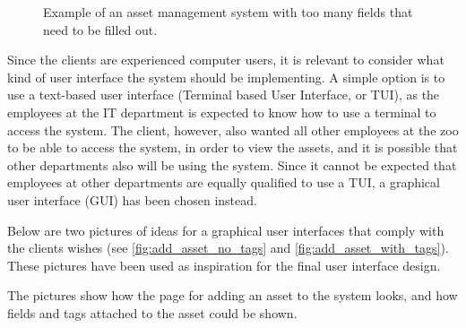 \begin{figure}[H]
    \centering
    \caption{Example of an asset management system with too many fields that need to be filled out. \cite{SnipeIT}}
    \label{fig:too-many-fields}
\end{figure}

Since the clients are experienced computer users, it is relevant to consider what kind of user interface the system should be implementing. A simple option is to use a text-based user interface (Terminal based User Interface, or TUI), as the employees at the IT department is expected to know how to use a terminal to access the system. The client, however, also wanted all other employees at the zoo to be able to access the system, in order to view the assets, and it is possible that other departments also will be using the system. Since it cannot be expected that employees at other departments are equally qualified to use a TUI, a graphical user interface (GUI) has been chosen instead. 
\par
Below are two pictures of ideas for a graphical user interfaces that comply with the clients wishes (see \autoref{fig:add_asset_no_tags} and \autoref{fig:add_asset_with_tags}). These pictures have been used as inspiration for the final user interface design.
\par
The pictures show how the page for adding an asset to the system looks, and how fields and tags attached to the asset could be shown.

